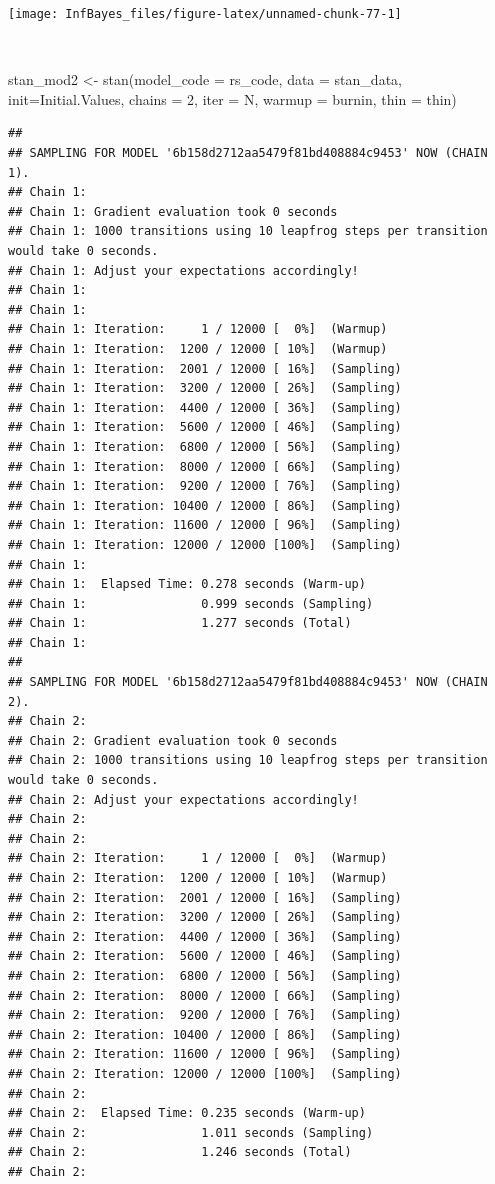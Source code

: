 \documentclass[
]{book}
\newenvironment{Shaded}{\begin{snugshade}}{\end{snugshade}}
\newcommand{\AttributeTok}[1]{\textcolor[rgb]{0.77,0.63,0.00}{#1}}
\newcommand{\DecValTok}[1]{\textcolor[rgb]{0.00,0.00,0.81}{#1}}
\newcommand{\FunctionTok}[1]{\textcolor[rgb]{0.00,0.00,0.00}{#1}}
\newcommand{\NormalTok}[1]{#1}
\newcommand{\OtherTok}[1]{\textcolor[rgb]{0.56,0.35,0.01}{#1}}
\begin{document}
\begin{center}\texttt{[image: InfBayes\_files/figure-latex/unnamed-chunk-77-1]} \end{center}

\(~\)

\begin{Shaded}
\begin{Highlighting}[]
\NormalTok{stan\_mod2 }\OtherTok{\textless{}{-}} \FunctionTok{stan}\NormalTok{(}\AttributeTok{model\_code =}\NormalTok{ rs\_code, }\AttributeTok{data =}\NormalTok{ stan\_data, }\AttributeTok{init=}\NormalTok{Initial.Values,}
            \AttributeTok{chains =} \DecValTok{2}\NormalTok{, }\AttributeTok{iter =}\NormalTok{ N, }\AttributeTok{warmup =}\NormalTok{ burnin, }\AttributeTok{thin =}\NormalTok{ thin)}
\end{Highlighting}
\end{Shaded}

\begin{verbatim}
## 
## SAMPLING FOR MODEL '6b158d2712aa5479f81bd408884c9453' NOW (CHAIN 1).
## Chain 1: 
## Chain 1: Gradient evaluation took 0 seconds
## Chain 1: 1000 transitions using 10 leapfrog steps per transition would take 0 seconds.
## Chain 1: Adjust your expectations accordingly!
## Chain 1: 
## Chain 1: 
## Chain 1: Iteration:     1 / 12000 [  0%]  (Warmup)
## Chain 1: Iteration:  1200 / 12000 [ 10%]  (Warmup)
## Chain 1: Iteration:  2001 / 12000 [ 16%]  (Sampling)
## Chain 1: Iteration:  3200 / 12000 [ 26%]  (Sampling)
## Chain 1: Iteration:  4400 / 12000 [ 36%]  (Sampling)
## Chain 1: Iteration:  5600 / 12000 [ 46%]  (Sampling)
## Chain 1: Iteration:  6800 / 12000 [ 56%]  (Sampling)
## Chain 1: Iteration:  8000 / 12000 [ 66%]  (Sampling)
## Chain 1: Iteration:  9200 / 12000 [ 76%]  (Sampling)
## Chain 1: Iteration: 10400 / 12000 [ 86%]  (Sampling)
## Chain 1: Iteration: 11600 / 12000 [ 96%]  (Sampling)
## Chain 1: Iteration: 12000 / 12000 [100%]  (Sampling)
## Chain 1: 
## Chain 1:  Elapsed Time: 0.278 seconds (Warm-up)
## Chain 1:                0.999 seconds (Sampling)
## Chain 1:                1.277 seconds (Total)
## Chain 1: 
## 
## SAMPLING FOR MODEL '6b158d2712aa5479f81bd408884c9453' NOW (CHAIN 2).
## Chain 2: 
## Chain 2: Gradient evaluation took 0 seconds
## Chain 2: 1000 transitions using 10 leapfrog steps per transition would take 0 seconds.
## Chain 2: Adjust your expectations accordingly!
## Chain 2: 
## Chain 2: 
## Chain 2: Iteration:     1 / 12000 [  0%]  (Warmup)
## Chain 2: Iteration:  1200 / 12000 [ 10%]  (Warmup)
## Chain 2: Iteration:  2001 / 12000 [ 16%]  (Sampling)
## Chain 2: Iteration:  3200 / 12000 [ 26%]  (Sampling)
## Chain 2: Iteration:  4400 / 12000 [ 36%]  (Sampling)
## Chain 2: Iteration:  5600 / 12000 [ 46%]  (Sampling)
## Chain 2: Iteration:  6800 / 12000 [ 56%]  (Sampling)
## Chain 2: Iteration:  8000 / 12000 [ 66%]  (Sampling)
## Chain 2: Iteration:  9200 / 12000 [ 76%]  (Sampling)
## Chain 2: Iteration: 10400 / 12000 [ 86%]  (Sampling)
## Chain 2: Iteration: 11600 / 12000 [ 96%]  (Sampling)
## Chain 2: Iteration: 12000 / 12000 [100%]  (Sampling)
## Chain 2: 
## Chain 2:  Elapsed Time: 0.235 seconds (Warm-up)
## Chain 2:                1.011 seconds (Sampling)
## Chain 2:                1.246 seconds (Total)
## Chain 2:
\end{verbatim}
\end{document}
